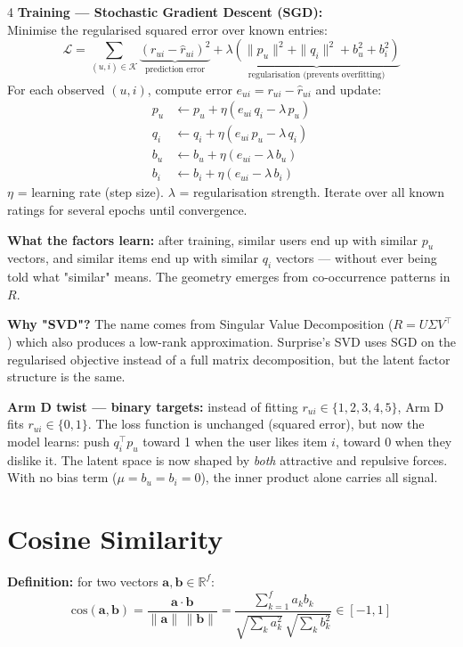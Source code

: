 \documentclass[9pt,a4paper,landscape]{article}
\begin{document}
\begin{multicols}{4}
\textbf{Training — Stochastic Gradient Descent (SGD):}\\
Minimise the regularised squared error over known entries:
\[
\mathcal{L} = \sum_{(u,i)\in\mathcal{K}} \underbrace{(r_{ui} - \hat{r}_{ui})^2}_{\text{prediction error}} + \lambda\underbrace{(\|p_u\|^2 + \|q_i\|^2 + b_u^2 + b_i^2)}_{\text{regularisation (prevents overfitting)}}
\]
For each observed $(u,i)$, compute error $e_{ui} = r_{ui} - \hat{r}_{ui}$ and update:
\begin{align*}
p_u &\leftarrow p_u + \eta(e_{ui}\,q_i - \lambda\,p_u) \\
q_i &\leftarrow q_i + \eta(e_{ui}\,p_u - \lambda\,q_i) \\
b_u &\leftarrow b_u + \eta(e_{ui} - \lambda\,b_u) \\
b_i &\leftarrow b_i + \eta(e_{ui} - \lambda\,b_i)
\end{align*}
$\eta$ = learning rate (step size). $\lambda$ = regularisation strength. Iterate over all known ratings for several epochs until convergence.

\textbf{What the factors learn:} after training, similar users end up with similar $p_u$ vectors, and similar items end up with similar $q_i$ vectors — without ever being told what "similar" means. The geometry emerges from co-occurrence patterns in $R$.

\textbf{Why "SVD"?} The name comes from Singular Value Decomposition ($R = U\Sigma V^\top$) which also produces a low-rank approximation. Surprise's SVD uses SGD on the regularised objective instead of a full matrix decomposition, but the latent factor structure is the same.

\textbf{Arm D twist — binary targets:} instead of fitting $r_{ui}\in\{1,2,3,4,5\}$, Arm D fits $r_{ui}\in\{0,1\}$. The loss function is unchanged (squared error), but now the model learns: push $q_i^\top p_u$ toward 1 when the user likes item $i$, toward 0 when they dislike it. The latent space is now shaped by \emph{both} attractive and repulsive forces. With no bias term ($\mu=b_u=b_i=0$), the inner product alone carries all signal.

\section{Cosine Similarity}

\textbf{Definition:} for two vectors $\mathbf{a}, \mathbf{b} \in \mathbb{R}^f$:
\[
\text{cos}(\mathbf{a},\mathbf{b}) = \frac{\mathbf{a}\cdot\mathbf{b}}{\|\mathbf{a}\|\,\|\mathbf{b}\|} = \frac{\sum_{k=1}^f a_k b_k}{\sqrt{\sum_k a_k^2}\,\sqrt{\sum_k b_k^2}} \in [-1, 1]
\]


\end{multicols}
\end{document}
